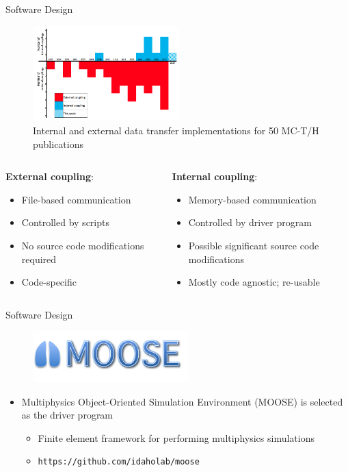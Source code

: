 \documentclass[10pt]{beamer}
\begin{document}
\begin{frame}{Software Design}

\begin{figure}
\includegraphics[width=5.65cm]{../Figures/internal_vs_external.png}
\caption{Internal and external data transfer implementations for 50 MC-T/H publications}
\end{figure}

\begin{columns}[t]
\begin{column}{0.485\linewidth}
\color{red}\textbf{External coupling}\color{black}:
	\begin{itemize}
	\item File-based communication
	\item Controlled by scripts
	\item No source code modifications required
	\item Code-specific\newline
	\end{itemize}
\end{column}
\begin{column}{0.485\linewidth}
\color{cyan}\textbf{Internal coupling}\color{black}:
	\begin{itemize}
	\item Memory-based communication
	\item Controlled by driver program
	\item Possible significant source code modifications
	\item Mostly code agnostic; re-usable
	\end{itemize}
\end{column}
\end{columns}
\end{frame}

\begin{frame}{Software Design}
\begin{figure}
\includegraphics[width=6cm]{../Figures/Moose_Multiphysics.png}
\end{figure}
\begin{itemize}
\item Multiphysics Object-Oriented Simulation Environment (MOOSE) is selected as the driver program
	\begin{itemize}
	\item Finite element framework for performing multiphysics simulations
	\item {\tt https://github.com/idaholab/moose}
	\end{itemize}
\end{itemize}
\end{frame}
\end{document}
